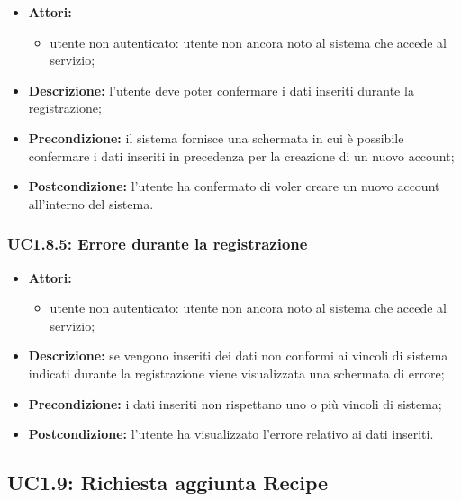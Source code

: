\begin{itemize}
	\item \textbf{Attori:}
	\begin{itemize}
		\item utente non autenticato: utente non ancora noto al sistema che accede al servizio;
	\end{itemize}
	\item \textbf{Descrizione:} l'utente deve poter confermare i dati inseriti durante la registrazione;
	\item \textbf{Precondizione:} il sistema fornisce una schermata in cui è possibile confermare i dati inseriti in precedenza per la creazione di un nuovo account;
	\item \textbf{Postcondizione:} l'utente ha confermato di voler creare un nuovo account all'interno
	del sistema.
\end{itemize}

\subsubsection{UC1.8.5: Errore durante la registrazione}

\begin{itemize}
	\item \textbf{Attori:}
	\begin{itemize}
		\item utente non autenticato: utente non ancora noto al sistema che accede al servizio;
	\end{itemize}
	\item \textbf{Descrizione:} se vengono inseriti dei dati non conformi ai vincoli di sistema indicati durante la registrazione viene visualizzata una schermata di errore;
	\item \textbf{Precondizione:} i dati inseriti non rispettano uno o più vincoli di sistema;
	\item \textbf{Postcondizione:} l'utente ha visualizzato l'errore relativo ai dati inseriti.
\end{itemize}



\subsection{UC1.9: Richiesta aggiunta Recipe}

